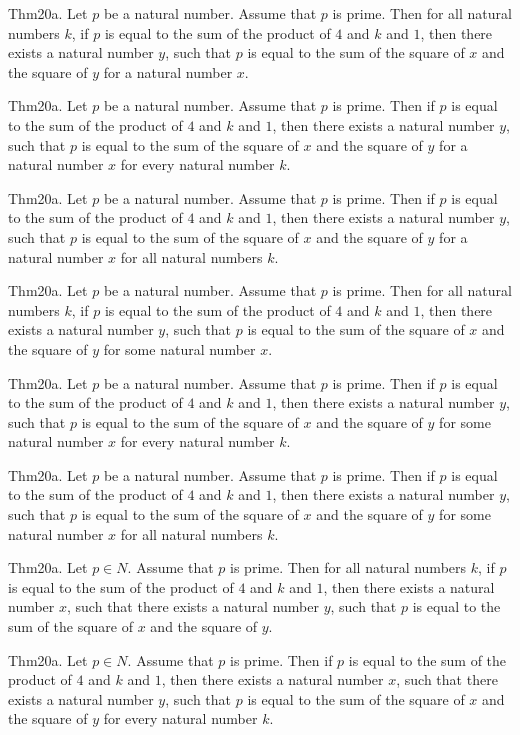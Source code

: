 \documentclass{article}
\begin{document}
Thm20a. Let $p$ be a natural number. Assume that $p$ is prime. Then for all natural numbers $k$, if $p$ is equal to the sum of the product of $4$ and $k$ and $1$, then there exists a natural number $y$, such that $p$ is equal to the sum of the square of $x$ and the square of $y$ for a natural number $x$.

Thm20a. Let $p$ be a natural number. Assume that $p$ is prime. Then if $p$ is equal to the sum of the product of $4$ and $k$ and $1$, then there exists a natural number $y$, such that $p$ is equal to the sum of the square of $x$ and the square of $y$ for a natural number $x$ for every natural number $k$.

Thm20a. Let $p$ be a natural number. Assume that $p$ is prime. Then if $p$ is equal to the sum of the product of $4$ and $k$ and $1$, then there exists a natural number $y$, such that $p$ is equal to the sum of the square of $x$ and the square of $y$ for a natural number $x$ for all natural numbers $k$.

Thm20a. Let $p$ be a natural number. Assume that $p$ is prime. Then for all natural numbers $k$, if $p$ is equal to the sum of the product of $4$ and $k$ and $1$, then there exists a natural number $y$, such that $p$ is equal to the sum of the square of $x$ and the square of $y$ for some natural number $x$.

Thm20a. Let $p$ be a natural number. Assume that $p$ is prime. Then if $p$ is equal to the sum of the product of $4$ and $k$ and $1$, then there exists a natural number $y$, such that $p$ is equal to the sum of the square of $x$ and the square of $y$ for some natural number $x$ for every natural number $k$.

Thm20a. Let $p$ be a natural number. Assume that $p$ is prime. Then if $p$ is equal to the sum of the product of $4$ and $k$ and $1$, then there exists a natural number $y$, such that $p$ is equal to the sum of the square of $x$ and the square of $y$ for some natural number $x$ for all natural numbers $k$.

Thm20a. Let $p \in N$. Assume that $p$ is prime. Then for all natural numbers $k$, if $p$ is equal to the sum of the product of $4$ and $k$ and $1$, then there exists a natural number $x$, such that there exists a natural number $y$, such that $p$ is equal to the sum of the square of $x$ and the square of $y$.

Thm20a. Let $p \in N$. Assume that $p$ is prime. Then if $p$ is equal to the sum of the product of $4$ and $k$ and $1$, then there exists a natural number $x$, such that there exists a natural number $y$, such that $p$ is equal to the sum of the square of $x$ and the square of $y$ for every natural number $k$.
\end{document}
